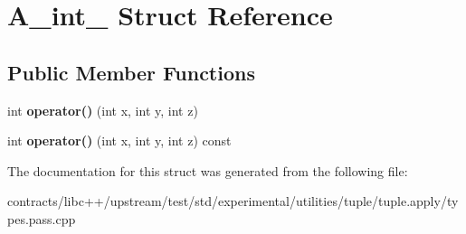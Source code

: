 \hypertarget{struct_a__int__3}{}\section{A\+\_\+int\+\_ Struct Reference}
\label{struct_a__int__3}
\subsection*{Public Member Functions}
\begin{DoxyCompactItemize}
\item 
\mbox{\label{struct_a__int__3_a28d7eb66d9c4c8034ca95818d1e2a423}} 
int {\bfseries operator()} (int x, int y, int z)
\item 
\mbox{\label{struct_a__int__3_a0dff1d064f43d6bd3054806327c892b7}} 
int {\bfseries operator()} (int x, int y, int z) const
\end{DoxyCompactItemize}


The documentation for this struct was generated from the following file\+:\begin{DoxyCompactItemize}
\item 
contracts/libc++/upstream/test/std/experimental/utilities/tuple/tuple.\+apply/types.\+pass.\+cpp\end{DoxyCompactItemize}
